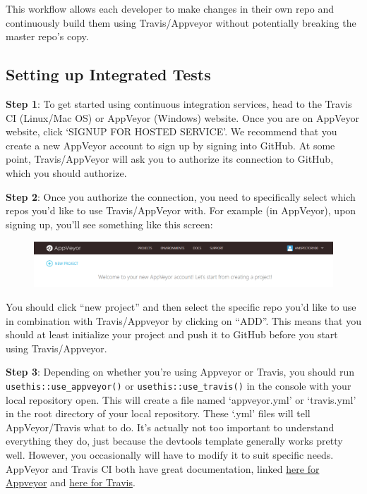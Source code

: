 \documentclass[]{book}
\begin{document}
This workflow allows each developer to make changes in their own repo
and continuously build them using Travis/Appveyor without potentially
breaking the master repo's copy.

\subsection{Setting up Integrated
Tests}\label{setting-up-integrated-tests}

\textbf{Step 1}: To get started using continuous integration services,
head to the Travis CI (Linux/Mac OS) or AppVeyor (Windows) website. Once
you are on AppVeyor website, click `SIGNUP FOR HOSTED SERVICE'. We
recommend that you create a new AppVeyor account to sign up by signing
into GitHub. At some point, Travis/AppVeyor will ask you to authorize
its connection to GitHub, which you should authorize.

\textbf{Step 2}: Once you authorize the connection, you need to
specifically select which repos you'd like to use Travis/AppVeyor with.
For example (in AppVeyor), upon signing up, you'll see something like
this screen:

\begin{figure}
\centering
\includegraphics{images/testSS/appveyor1.PNG}
\caption{}
\end{figure}

You should click ``new project'' and then select the specific repo you'd
like to use in combination with Travis/Appveyor by clicking on ``ADD''.
This means that you should at least initialize your project and push it
to GitHub before you start using Travis/Appveyor.

\textbf{Step 3}: Depending on whether you're using Appveyor or Travis,
you should run \texttt{usethis::use\_appveyor()} or
\texttt{usethis::use\_travis()} in the console with your local
repository open. This will create a file named `appveyor.yml' or
`travis.yml' in the root directory of your local repository. These
`.yml' files will tell AppVeyor/Travis what to do. It's actually not too
important to understand everything they do, just because the devtools
template generally works pretty well. However, you occasionally will
have to modify it to suit specific needs. AppVeyor and Travis CI both
have great documentation, linked
\href{https://www.appveyor.com/docs/build-configuration/}{here for
Appveyor} and \href{https://docs.travis-ci.com/user/languages/r/}{here
for Travis}.
\end{document}
